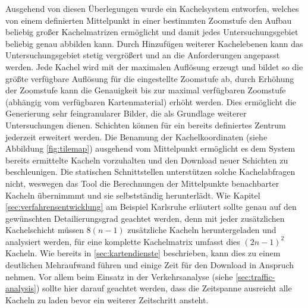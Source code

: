 Ausgehend von diesen Überlegungen wurde ein Kachelsystem entworfen, welches von einem definierten Mittelpunkt in einer bestimmten Zoomstufe den Aufbau beliebig großer Kachelmatrizen ermöglicht und damit jedes Untersuchungsgebiet beliebig genau abbilden kann. Durch Hinzufügen weiterer Kachelebenen kann das Untersuchungsgebiet stetig vergrößert und an die Anforderungen angepasst werden. Jede Kachel wird mit der maximalen Auflösung erzeugt und bildet so die größte verfügbare Auflösung für die eingestellte Zoomstufe ab, durch Erhöhung der Zoomstufe kann die Genauigkeit bis zur maximal verfügbaren Zoomstufe (abhängig vom verfügbaren Kartenmaterial) erhöht werden. Dies ermöglicht die Generierung sehr feingranularer Bilder, die als Grundlage weiterer Untersuchungen dienen. Schichten können für ein bereits definiertes Zentrum jederzeit erweitert werden. Die Benamung der Kachelkoordinaten (siehe Abbildung \ref{fig:tilemap}) ausgehend vom Mittelpunkt ermöglicht es dem System bereits ermittelte Kacheln vorzuhalten und den Download neuer Schichten zu beschleunigen. Die statischen Schnittstellen unterstützen solche Kachelabfragen nicht, weswegen das Tool die Berechnungen der Mittelpunkte benachbarter Kacheln übernimmmt und sie selbstständig herunterlädt. Wie Kapitel \ref{sec:verfahrensentwicklung} am Beispiel Karlsruhe erläutert sollte genau auf den gewünschten Detailierungsgrad geachtet werden, denn mit jeder zusätzlichen Kachelschicht müssen $8(n-1)$ zusätzliche Kacheln heruntergeladen und analysiert werden, für eine komplette Kachelmatrix umfasst dies $(2n-1)^2$ Kacheln. Wie bereits in \ref{sec:kartendienste} beschrieben, kann dies zu einem deutlichen Mehraufwand führen und einige Zeit für den Download in Anspruch nehmen. Vor allem beim Einsatz in der Verkehrsanalyse (siehe \ref{sec:traffic-analysis}) sollte hier darauf geachtet werden, dass die Zeitspanne ausreicht alle Kacheln zu laden bevor ein weiterer Zeitschritt ansteht.
